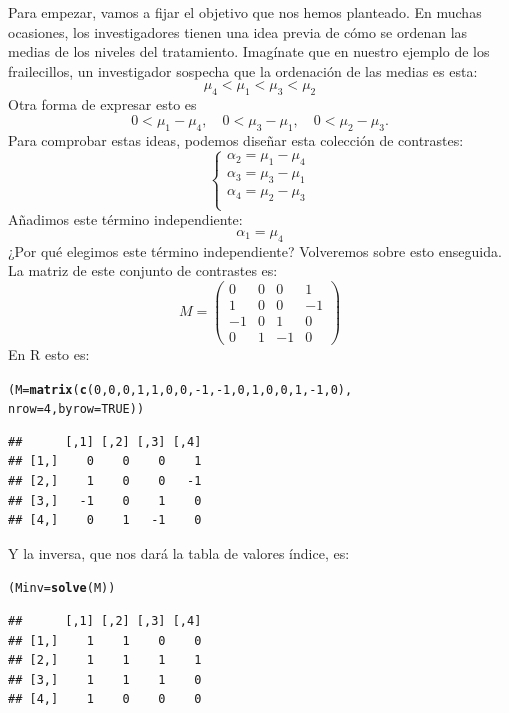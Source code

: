 \documentclass[10pt,a4paper]{article}\usepackage[]{graphicx}\usepackage[]{color}
\makeatletter
\newcommand{\hlnum}[1]{\textcolor[rgb]{0.686,0.059,0.569}{#1}}%
\newcommand{\hlopt}[1]{\textcolor[rgb]{0,0,0}{#1}}%
\newcommand{\hlstd}[1]{\textcolor[rgb]{0.345,0.345,0.345}{#1}}%
\newcommand{\hlkwb}[1]{\textcolor[rgb]{0.69,0.353,0.396}{#1}}%
\newcommand{\hlkwc}[1]{\textcolor[rgb]{0.333,0.667,0.333}{#1}}%
\newcommand{\hlkwd}[1]{\textcolor[rgb]{0.737,0.353,0.396}{\textbf{#1}}}%
\newenvironment{kframe}{%
 \def\at@end@of@kframe{}%
 \ifinner\ifhmode%
  \def\at@end@of@kframe{\end{minipage}}%
  \begin{minipage}{\columnwidth}%
 \fi\fi%
 \def\FrameCommand##1{\hskip\@totalleftmargin \hskip-\fboxsep
 \colorbox{shadecolor}{##1}\hskip-\fboxsep
     \hskip-\linewidth \hskip-\@totalleftmargin \hskip\columnwidth}%
 \MakeFramed {\advance\hsize-\width
   \@totalleftmargin\z@ \linewidth\hsize
   \@setminipage}}%
 {\par\unskip\endMakeFramed%
 \at@end@of@kframe}
\newenvironment{knitrout}{}{} %
\newcounter {cont01}
\makeatother
\begin{document}
Para empezar, vamos a fijar el objetivo que nos hemos planteado. En muchas ocasiones, los investigadores tienen una idea previa de cómo se ordenan las medias de  los niveles del tratamiento. Imagínate que en nuestro ejemplo de los frailecillos, un investigador sospecha que la ordenación de las medias es esta:
$$\mu_4 < \mu_1 < \mu_3 < \mu_2$$
Otra forma de expresar esto es
$$0 < \mu_1 - \mu_4, \quad  0 < \mu_3 - \mu_1, \quad 0 < \mu_2 - \mu_3.$$
Para comprobar estas ideas, podemos diseñar esta colección de contrastes:
$$
\begin{cases}
\alpha_2 = \mu_1 - \mu_4\\
\alpha_3 = \mu_3 - \mu_1\\
\alpha_4 = \mu_2 - \mu_3\\
\end{cases}
$$
Añadimos este término independiente:
$$\alpha_1 = \mu_4$$
¿Por qué elegimos este término independiente? Volveremos sobre esto enseguida. La matriz de este conjunto de contrastes es:
$$M=\left(
\begin{array}{rrrr}
0&0&0&1\\
1&0&0&-1\\
-1&0&1&0\\
0&1&-1&0
\end{array}
\right)$$
En R esto es:
\begin{knitrout}
\color{fgcolor}\begin{kframe}
\begin{alltt}
\hlstd{(M} \hlkwb{=} \hlkwd{matrix}\hlstd{(}\hlkwd{c}\hlstd{(}\hlnum{0}\hlstd{,} \hlnum{0}\hlstd{,} \hlnum{0}\hlstd{,} \hlnum{1}\hlstd{,} \hlnum{1}\hlstd{,} \hlnum{0}\hlstd{,} \hlnum{0}\hlstd{,} \hlopt{-}\hlnum{1}\hlstd{,}\hlopt{-}\hlnum{1}\hlstd{,} \hlnum{0}\hlstd{,} \hlnum{1}\hlstd{,} \hlnum{0}\hlstd{,} \hlnum{0}\hlstd{,} \hlnum{1}\hlstd{,} \hlopt{-}\hlnum{1}\hlstd{,} \hlnum{0}\hlstd{),}
            \hlkwc{nrow} \hlstd{=} \hlnum{4}\hlstd{,} \hlkwc{byrow} \hlstd{=} \hlnum{TRUE}\hlstd{))}
\end{alltt}
\begin{verbatim}
##      [,1] [,2] [,3] [,4]
## [1,]    0    0    0    1
## [2,]    1    0    0   -1
## [3,]   -1    0    1    0
## [4,]    0    1   -1    0
\end{verbatim}
\end{kframe}
\end{knitrout}
Y la inversa, que nos dará la tabla de valores índice, es:
\begin{knitrout}
\color{fgcolor}\begin{kframe}
\begin{alltt}
\hlstd{(Minv} \hlkwb{=} \hlkwd{solve}\hlstd{(M))}
\end{alltt}
\begin{verbatim}
##      [,1] [,2] [,3] [,4]
## [1,]    1    1    0    0
## [2,]    1    1    1    1
## [3,]    1    1    1    0
## [4,]    1    0    0    0
\end{verbatim}
\end{kframe}
\end{knitrout}
\end{document}
